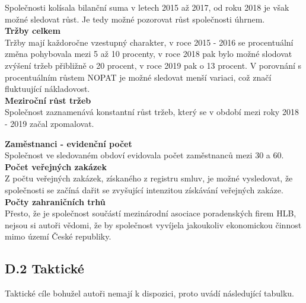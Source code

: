 Společnosti kolísala bilanční suma v letech 2015 až 2017, od roku 2018 je však možné sledovat růst. Je tedy možné pozorovat růst společnosti úhrnem.\\

\noindent\textbf{Tržby celkem}\\

Tržby mají každoročne vzestupný charakter, v roce 2015 - 2016 se procentuální změna pohybovala mezi 5 až 10 procenty, v roce 2018 pak bylo možné slodovat zvýšení tržeb přibližně o 20 procent, v roce 2019 pak o 13 procent. V porovnání s procentuálním růstem NOPAT je možné sledovat menší variaci, což značí fluktuující nákladovost.\\

\noindent\textbf{Meziroční růst tržeb}\\

Společnost zaznamenává konstantní růst tržeb, který se v období mezi roky 2018 - 2019 začal zpomalovat.\\

\newpage

\noindent\textbf{Zaměstnanci - evidenční počet}\\

Společnost ve sledovaném obdoví evidovala počet zaměstnanců mezi 30 a 60.\\

\noindent\textbf{Počet veřejných zakázek}\\

Z počtu veřejných zakázek, získaného z registru smluv, je možné vysledovat, že společnosti se začíná dařit se zvyšující intenzitou získávání veřejných zakáze.\\

\noindent\textbf{Počty zahraničních trhů}\\

Přesto, že je společnost součástí mezinárodní asociace poradenských firem HLB, nejsou si autoři vědomi, že by společnost vyvíjela jakoukoliv ekonomickou činnost mimo území České republiky.\\

\subsection*{D.2 Taktické}
\label{sec:Takticke}

Taktické cíle bohužel autoři nemají k dispozici, proto uvádí následující tabulku.\\

